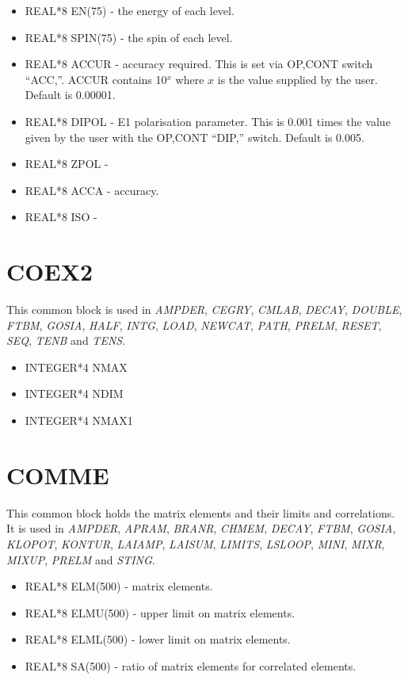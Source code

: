 \begin{itemize}
\item REAL*8 EN(75) - the energy of each level.
\item REAL*8 SPIN(75) - the spin of each level.
\item REAL*8 ACCUR - accuracy required. This is set via OP,CONT switch
``ACC,''. ACCUR contains 10$^x$ where $x$ is the value supplied by the user.
Default is 0.00001.
\item REAL*8 DIPOL - E1 polarisation parameter. This is 0.001 times the
value given by the user with the OP,CONT ``DIP,'' switch. Default is 0.005.
\item REAL*8 ZPOL - 
\item REAL*8 ACCA - accuracy.
\item REAL*8 ISO -
\end{itemize}

\section{COEX2}

This common block is used in {\em AMPDER}, {\em CEGRY}, {\em CMLAB}, {\em
DECAY}, {\em DOUBLE}, {\em FTBM}, {\em GOSIA}, {\em HALF}, {\em INTG}, {\em
LOAD}, {\em NEWCAT}, {\em PATH}, {\em PRELM}, {\em RESET}, {\em SEQ}, {\em
TENB} and {\em TENS}.

\begin{itemize}
\item INTEGER*4 NMAX
\item INTEGER*4 NDIM
\item INTEGER*4 NMAX1
\end{itemize}

\section{COMME}

This common block holds the matrix elements and their limits and
correlations. It is used in {\em AMPDER}, {\em APRAM}, {\em BRANR}, {\em
CHMEM}, {\em DECAY}, {\em FTBM}, {\em GOSIA}, {\em KLOPOT}, {\em KONTUR},
{\em LAIAMP}, {\em LAISUM}, {\em LIMITS}, {\em LSLOOP}, {\em MINI}, {\em
MIXR}, {\em MIXUP}, {\em PRELM} and {\em STING}.

\begin{itemize}
\item REAL*8 ELM(500) - matrix elements.
\item REAL*8 ELMU(500) - upper limit on matrix elements.
\item REAL*8 ELML(500) - lower limit on matrix elements.
\item REAL*8 SA(500) - ratio of matrix elements for correlated elements.
\end{itemize}

